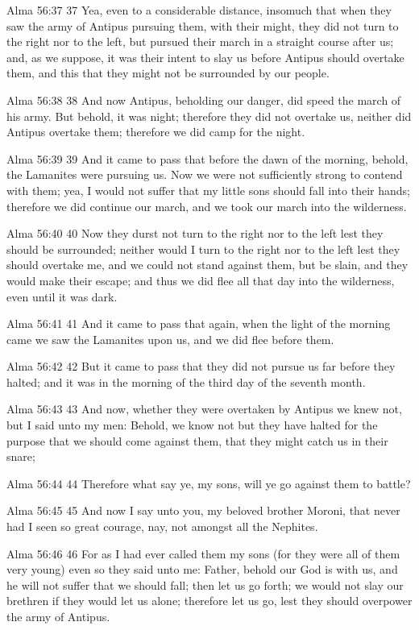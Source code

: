 Alma 56:37
 37 Yea, even to a considerable distance, insomuch that when they
saw the army of Antipus pursuing them, with their might, they did
not turn to the right nor to the left, but pursued their march in
a straight course after us; and, as we suppose, it was their
intent to slay us before Antipus should overtake them, and this
that they might not be surrounded by our people.

Alma 56:38
 38 And now Antipus, beholding our danger, did speed the march of
his army. But behold, it was night; therefore they did not
overtake us, neither did Antipus overtake them; therefore we did
camp for the night.

Alma 56:39
 39 And it came to pass that before the dawn of the morning,
behold, the Lamanites were pursuing us. Now we were not
sufficiently strong to contend with them; yea, I would not suffer
that my little sons should fall into their hands; therefore we
did continue our march, and we took our march into the
wilderness.

Alma 56:40
 40 Now they durst not turn to the right nor to the left lest
they should be surrounded; neither would I turn to the right nor
to the left lest they should overtake me, and we could not stand
against them, but be slain, and they would make their escape; and
thus we did flee all that day into the wilderness, even until it
was dark.

Alma 56:41
 41 And it came to pass that again, when the light of the morning
came we saw the Lamanites upon us, and we did flee before them.

Alma 56:42
 42 But it came to pass that they did not pursue us far before
they halted; and it was in the morning of the third day of the
seventh month.

Alma 56:43
 43 And now, whether they were overtaken by Antipus we knew not,
but I said unto my men: Behold, we know not but they have halted
for the purpose that we should come against them, that they might
catch us in their snare;

Alma 56:44
 44 Therefore what say ye, my sons, will ye go against them to
battle?

Alma 56:45
 45 And now I say unto you, my beloved brother Moroni, that never
had I seen so great courage, nay, not amongst all the Nephites.

Alma 56:46
 46 For as I had ever called them my sons (for they were all of
them very young) even so they said unto me: Father, behold our
God is with us, and he will not suffer that we should fall; then
let us go forth; we would not slay our brethren if they would let
us alone; therefore let us go, lest they should overpower the
army of Antipus.

